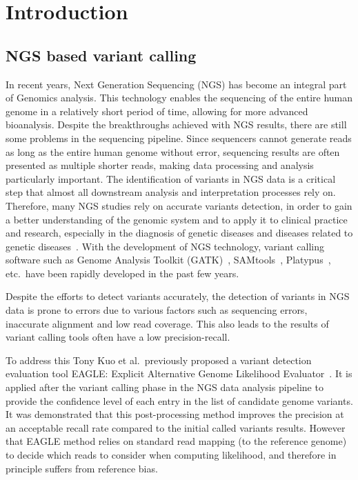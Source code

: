 \documentclass[PhD]{PHlab-thesis}
\begin{document}
\printnomenclature[5cm]

\newpage
\setcounter{page}{1}



\chapter{Introduction}
\section{NGS based variant calling}
In recent years, Next Generation Sequencing (NGS) has become an integral part of Genomics analysis. This technology enables the sequencing of the entire human genome in a relatively short period of time, allowing for more advanced bioanalysis. Despite the breakthroughs achieved with NGS results, there are still some problems in the sequencing pipeline. Since sequencers cannot generate reads as long as the entire human genome without error, sequencing results are often presented as multiple shorter reads, making data processing and analysis particularly important. The identification of variants in NGS data is a critical step that almost all downstream analysis and interpretation processes rely on. Therefore, many NGS studies rely on accurate variants detection, in order to gain a better understanding of the genomic system and to apply it to clinical practice and research, especially in the diagnosis of genetic diseases and diseases related to genetic diseases~\cite{Shashi2014NGS, Stenson2017NGS}. With the development of NGS technology, variant calling software such as Genome Analysis Toolkit (GATK)~\cite{McKenna2010GATK}, SAMtools~\cite{li2009SAMtools}, Platypus~\cite{Rimmer2014Platypus}, etc.\ have been rapidly developed in the past few years.

Despite the efforts to detect variants accurately, the detection of variants in NGS data is prone to errors due to various factors such as sequencing errors, inaccurate alignment and low read coverage. This also leads to the results of variant calling tools often have a low precision-recall. 

To address this Tony Kuo et al.\ previously proposed a variant detection evaluation tool EAGLE: Explicit Alternative Genome Likelihood Evaluator~\cite{Kuo2018EAGLE}.  It is applied after the variant calling phase in the NGS data analysis pipeline to provide the confidence level of each entry in the list of candidate genome variants. It was demonstrated that this post-processing method improves the precision at an acceptable recall rate compared to the initial called variants results.  However that EAGLE method relies on standard read mapping (to the reference genome) to decide which reads to consider when computing likelihood, and therefore in principle suffers from reference bias.
\end{document}
